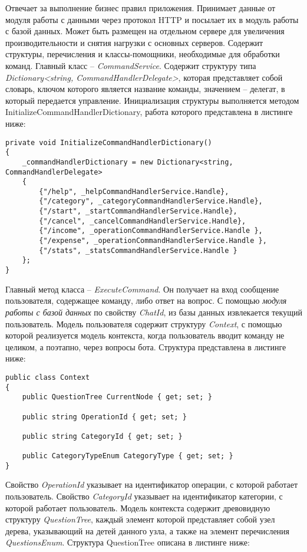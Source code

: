 Отвечает за выполнение бизнес правил приложения. Принимает данные от модуля работы с данными через протокол HTTP и посылает их в модуль работы с базой данных. Может быть размещен на отдельном сервере для увеличения производительности и снятия нагрузки с основных серверов.
Содержит структуры, перечисления и классы-помощники, необходимые для обработки команд.
Главный класс – \emph{CommandService}. Содержит структуру типа \emph{Dictionary<string, CommandHandlerDelegate>}, которая представляет собой словарь, ключом которого является название команды, значением – делегат, в который передается управление.
Инициализация структуры выполняется методом InitializeCommandHandlerDictionary, работа которого представлена в листинге ниже:

\lstset{style=sharpc}
\begin{lstlisting}
private void InitializeCommandHandlerDictionary()
{
	_commandHandlerDictionary = new Dictionary<string, CommandHandlerDelegate>
	{
		{"/help", _helpCommandHandlerService.Handle},
		{"/category", _categoryCommandHandlerService.Handle},
		{"/start", _startCommandHandlerService.Handle},
		{"/cancel", _cancelCommandHandlerService.Handle},
		{"/income", _operationCommandHandlerService.Handle },
		{"/expense", _operationCommandHandlerService.Handle },
		{"/stats", _statsCommandHandlerService.Handle }
	};
}
\end{lstlisting}

Главный метод класса – \emph{ExecuteCommand}. Он получает на вход сообщение пользователя, содержащее команду, либо ответ на вопрос. С помощью \emph{модуля работы с базой данных} по свойству \emph{ChatId}, из базы данных извлекается текущий пользователь.
Модель пользователя содержит структуру \emph{Context}, с помощью которой реализуется модель контекста, когда пользователь вводит команду не целиком, а поэтапно, через вопросы бота. Структура представлена в листинге ниже:

\lstset{style=sharpc}
\begin{lstlisting}
public class Context
{
	public QuestionTree CurrentNode { get; set; }

	public string OperationId { get; set; }

	public string CategoryId { get; set; }

	public CategoryTypeEnum CategoryType { get; set; }
}
\end{lstlisting}

Свойство \emph{OperationId} указывает на идентификатор операции, с которой работает пользователь.
Свойство \emph{CategoryId} указывает на идентификатор категории, с которой работает пользователь.
Модель контекста содержит древовидную структуру \emph{QuestionTree}, каждый элемент которой представляет собой узел дерева, указывающий на детей данного узла, а также на элемент перечисления \emph{QuestionsEnum}. Структура QuestionTree описана в листинге ниже:

